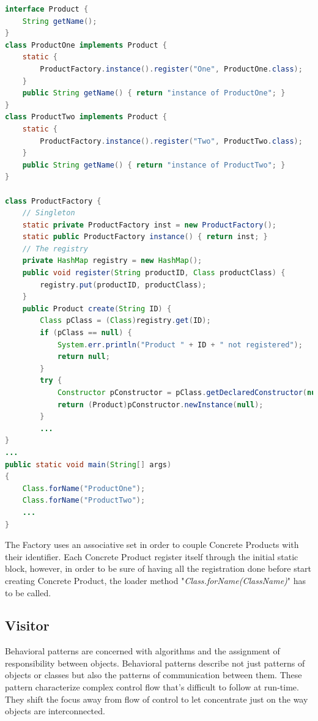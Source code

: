 \begin{lstlisting}[language=Java]
interface Product {
	String getName();
}
class ProductOne implements Product {
	static {
		ProductFactory.instance().register("One", ProductOne.class);
	}
	public String getName() { return "instance of ProductOne"; }
}
class ProductTwo implements Product {
	static {
		ProductFactory.instance().register("Two", ProductTwo.class);
	}
	public String getName() { return "instance of ProductTwo"; }
}

class ProductFactory {
	// Singleton
	static private ProductFactory inst = new ProductFactory();
	static public ProductFactory instance() { return inst; }
	// The registry
	private HashMap registry = new HashMap();
	public void register(String productID, Class productClass) {
		registry.put(productID, productClass);
	}
	public Product create(String ID) {
		Class pClass = (Class)registry.get(ID);
		if (pClass == null) {
			System.err.println("Product " + ID + " not registered");
			return null;
		}
		try {
			Constructor pConstructor = pClass.getDeclaredConstructor(null);
			return (Product)pConstructor.newInstance(null);
		}
        ...
}
...
public static void main(String[] args)
{
	Class.forName("ProductOne");
	Class.forName("ProductTwo");
    ...
}
\end{lstlisting}
The Factory uses an associative set in order to couple Concrete Products with their identifier. Each Concrete Product register itself through the initial static block, however, in order to be sure of having all the registration done before start creating Concrete Product, the loader method "\textit{Class.forName(ClassName)}" has to be called.

\subsection{Visitor}

Behavioral patterns are concerned with algorithms and the assignment of responsibility between objects. Behavioral patterns describe not just patterns of objects or classes but also the patterns of communication between them. These pattern characterize complex control flow that's difficult to follow at run-time. They shift the focus away from flow of control to let concentrate just on the way objects are interconnected. 
